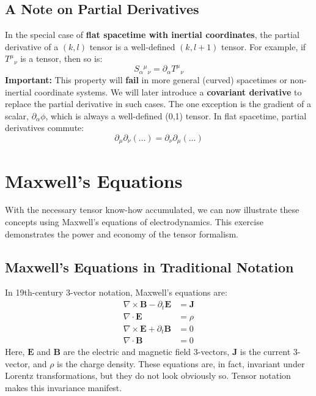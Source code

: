 \documentclass[11pt, a4paper]{report}
\begin{document}
\subsection*{A Note on Partial Derivatives}

In the special case of \textbf{flat spacetime with inertial coordinates}, the partial derivative of a $(k,l)$ tensor is a well-defined $(k, l+1)$ tensor. For example, if ${T^\mu}_\nu$ is a tensor, then so is:
\begin{equation}
    S_{\alpha}{}^\mu{}_\nu = \partial_\alpha {T^\mu}_\nu
\end{equation}
\textbf{Important:} This property will \textbf{fail} in more general (curved) spacetimes or non-inertial coordinate systems. We will later introduce a \textbf{covariant derivative} to replace the partial derivative in such cases. The one exception is the gradient of a scalar, $\partial_\alpha\phi$, which is always a well-defined (0,1) tensor. In flat spacetime, partial derivatives commute:
\begin{equation}
    \partial_\mu \partial_\nu (\dots) = \partial_\nu \partial_\mu (\dots)
\end{equation}
\section{Maxwell's Equations}

With the necessary tensor know-how accumulated, we can now illustrate these concepts using Maxwell's equations of electrodynamics. This exercise demonstrates the power and economy of the tensor formalism.

\subsection*{Maxwell's Equations in Traditional Notation}

In 19th-century 3-vector notation, Maxwell's equations are:
\begin{align}
    \nabla \times \mathbf{B} - \partial_t \mathbf{E} &= \mathbf{J} \\
    \nabla \cdot \mathbf{E} &= \rho \\
    \nabla \times \mathbf{E} + \partial_t \mathbf{B} &= 0 \\
    \nabla \cdot \mathbf{B} &= 0
\end{align}
Here, $\mathbf{E}$ and $\mathbf{B}$ are the electric and magnetic field 3-vectors, $\mathbf{J}$ is the current 3-vector, and $\rho$ is the charge density. These equations are, in fact, invariant under Lorentz transformations, but they do not look obviously so. Tensor notation makes this invariance manifest.
\end{document}
